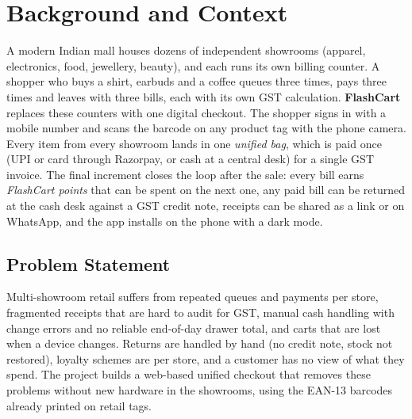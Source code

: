 \documentclass[12pt,letterpaper,twoside,openany]{report}
\begin{document}
\section{Background and Context}
A modern Indian mall houses dozens of independent showrooms (apparel, electronics, food,
jewellery, beauty), and each runs its own billing counter. A shopper who buys a shirt,
earbuds and a coffee queues three times, pays three times and leaves with three bills, each
with its own GST calculation. \textbf{FlashCart} replaces these counters with one digital
checkout. The shopper signs in with a mobile number and scans the barcode on any product tag
with the phone camera. Every item from every showroom lands in one \emph{unified bag}, which
is paid once (UPI or card through Razorpay, or cash at a central desk) for a single GST
invoice. The final increment closes the loop after the sale: every bill earns
\emph{FlashCart points} that can be spent on the next one, any paid bill can be returned at
the cash desk against a GST credit note, receipts can be shared as a link or on WhatsApp,
and the app installs on the phone with a dark mode.

\subsection{Problem Statement}
Multi-showroom retail suffers from repeated queues and payments per store, fragmented
receipts that are hard to audit for GST, manual cash handling with change errors and no
reliable end-of-day drawer total, and carts that are lost when a device changes. Returns are
handled by hand (no credit note, stock not restored), loyalty schemes are per store, and a
customer has no view of what they spend. The project builds a web-based unified checkout that
removes these problems without new hardware in the showrooms, using the EAN-13 barcodes already
printed on retail tags.
\end{document}
